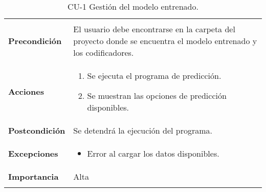 \begin{longtable}[h!]{@{}ll@{}}
\begin{minipage}[t]{0.71\columnwidth}
\end{minipage}\tabularnewline
\begin{minipage}[t]{0.23\columnwidth}\raggedright\strut
\textbf{Precondición}\strut
\end{minipage} & \begin{minipage}[t]{0.71\columnwidth}\raggedright\strut
El usuario debe encontrarse en la carpeta del proyecto donde se encuentra el modelo entrenado y los codificadores.\strut
\end{minipage}\tabularnewline
\begin{minipage}[t]{0.23\columnwidth}\raggedright\strut
\textbf{Acciones}\strut
\end{minipage} & \begin{minipage}[t]{0.71\columnwidth}\raggedright\strut
\begin{enumerate}
\def\labelenumi{\arabic{enumi}.}
\tightlist
\item
  Se ejecuta el programa de predicción.
\item
  Se muestran las opciones de predicción disponibles.
\end{enumerate}\strut
\end{minipage}\tabularnewline
\begin{minipage}[t]{0.23\columnwidth}\raggedright\strut
\textbf{Postcondición}\strut
\end{minipage} & \begin{minipage}[t]{0.71\columnwidth}\raggedright\strut
Se detendrá la ejecución del programa.\strut
\end{minipage}\tabularnewline
\begin{minipage}[t]{0.23\columnwidth}\raggedright\strut
\textbf{Excepciones}\strut
\end{minipage} & \begin{minipage}[t]{0.71\columnwidth}\raggedright\strut
\begin{itemize}
\tightlist
\item
  Error al cargar los datos disponibles.
\end{itemize}\strut
\end{minipage}\tabularnewline
\begin{minipage}[t]{0.23\columnwidth}\raggedright\strut
\textbf{Importancia}\strut
\end{minipage} & \begin{minipage}[t]{0.71\columnwidth}\raggedright\strut
Alta\strut
\end{minipage}\tabularnewline
\bottomrule
\caption{CU-1 Gestión del modelo entrenado.}
\end{longtable}

